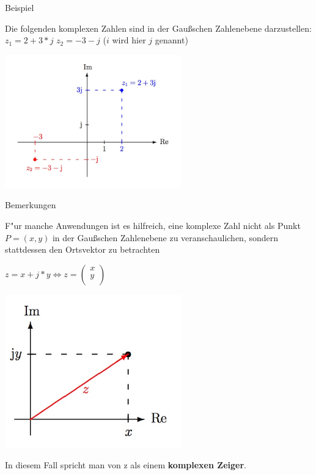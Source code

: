 		\begin{Bemerkung}
		Beispiel\\
		\end{Bemerkung}

		Die folgenden komplexen Zahlen sind in der Gaußschen Zahlenebene darzustellen: \\
		$z_{1} = 2+3*j$  $z_{2} =-3-j$ ($i$ wird hier $j$ genannt)

		\includegraphics[width=3in]{kap6/komplexezahlen2}

		\begin{Bemerkung}
		Bemerkungen\\
		\end{Bemerkung}

		F"ur manche Anwendungen ist es hilfreich, eine komplexe Zahl nicht als Punkt $P=(x,y)$ in der Gaußschen Zahlenebene zu veranschaulichen, sondern stattdessen den Ortsvektor zu betrachten

		$z=x+j*y \Leftrightarrow z=
		\begin{pmatrix}
		x\\
		y\\
		\end{pmatrix}$

		\includegraphics[width=3in]{kap6/komplexezahlen3}

		In diesem Fall spricht man von z als einem \textbf{komplexen Zeiger}.\\

